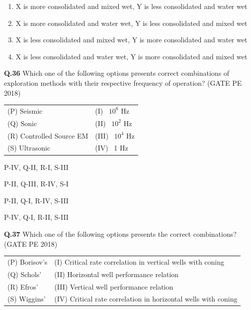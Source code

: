 \documentclass[15pt,a4paper]{article}
\begin{document}
\begin{enumerate} 

	\item X is more consolidated and mixed wet, Y is less consolidated and water wet
	\item X is more consolidated and water wet, Y is less consolidated and mixed wet
	\item X is less consolidated and mixed wet, Y is more consolidated and water wet
	\item X is less consolidated and water wet, Y is more consolidated and mixed wet\\
\end{enumerate}
\noindent\textbf{Q.36} Which one of the following options presents correct combinations of exploration methods with their respective frequency of operation? \hfill (GATE PE 2018)

\vspace{0.3cm}
\begin{tabular}{ll}
(P) Seismic               & (I) ~$10^6$ Hz \\
(Q) Sonic                 & (II) ~$10^2$ Hz \\
(R) Controlled Source EM & (III) ~$10^4$ Hz \\
(S) Ultrasonic            & (IV) ~1 Hz \\
\end{tabular}


\begin{enumerate} 
\begin{multicols}{2}
\item P-IV, Q-II, R-I, S-III \item P-II, Q-III, R-IV, S-I \\
\item P-II, Q-I, R-IV, S-III \item P-IV, Q-I, R-II, S-III \\
\end{multicols}
\end{enumerate}

\pagebreak

\noindent\textbf{Q.37} Which one of the following options presents the correct combinations? \hfill (GATE PE 2018)

\vspace{0.3cm}
\begin{tabular}{ll}
(P) Borisov's  & (I) Critical rate correlation in vertical wells with coning \\
(Q) Schols'    & (II) Horizontal well performance relation \\
(R) Efros'     & (III) Vertical well performance relation \\
(S) Wiggins'   & (IV) Critical rate correlation in horizontal wells with coning 
\end{tabular}
\end{document}
